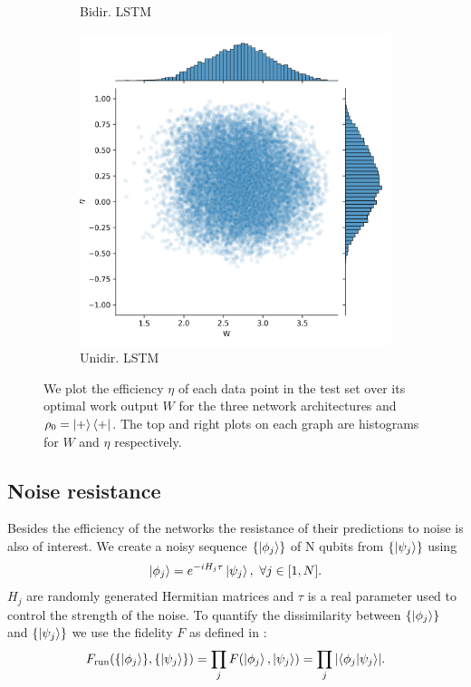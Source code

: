 \begin{figure}
\begin{subfigure}{0.32\textwidth}
		\caption{Bidir. LSTM}
		\label{}
	\end{subfigure}
	\begin{subfigure}{0.32\textwidth}
	\centering
	\includegraphics[width=\textwidth]{img/work_dist_n5_eigen_uni}
	\caption{Unidir. LSTM}
	\label{}
\end{subfigure}
	\caption{We plot the efficiency $\eta$ of each data point in the test set over its optimal work output $W$ for the three network architectures and $\rho_0 = \ket{+}\bra{+}$. The top and right plots on each graph are histograms for $W$ and $\eta$ respectively.}
	\label{}
\end{figure}

\subsection{Noise resistance}
Besides the efficiency of the networks the resistance of their predictions to noise is also of interest.
We create a noisy sequence $\{\ket{\phi_j}\}$ of N qubits from $\{\ket{\psi_j}\}$ using
\begin{align*}
	\ket{\phi_j} = e^{-i H_j \tau} \ket{\psi_j}, \ \forall j \in [1, N].
\end{align*}
$H_j$ are randomly generated Hermitian matrices and $\tau$ is a real parameter used to control the strength of the noise.
To quantify the dissimilarity between $\{\ket{\phi_j}\}$ and $\{\ket{\psi_j}\}$ we use the fidelity $F$ as defined in \cite{10.5555/1972505}:
\begin{align*}
	F_{\text{run}}(\{\ket{\phi_j}\}, \{\ket{\psi_j}\}) = \prod_j F(\ket{\phi_j}, \ket{\psi_j}) = \prod_j \abs{\bra{\phi_j}\ket{\psi_j}}.
\end{align*}
